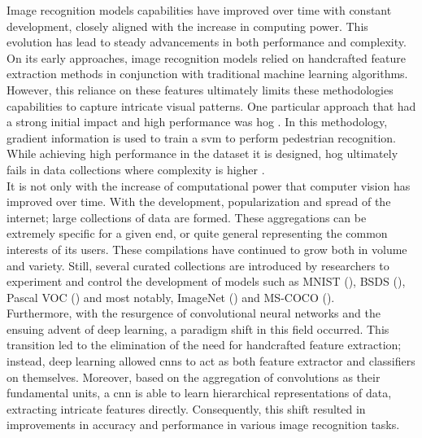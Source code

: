 \noindent Image recognition models capabilities have improved over time with constant development, 
closely aligned with the increase in computing power. This evolution has lead to steady 
advancements in both performance and complexity. On its early approaches, image recognition models 
relied on handcrafted feature extraction methods  in conjunction with traditional machine learning 
algorithms. However, this reliance on these features ultimately limits these methodologies 
capabilities to capture intricate visual patterns.
One particular approach that had a strong initial impact and high performance was \gls{hog} 
\autocite{dalal2005histograms}. In this methodology, gradient information is used to train a 
\gls{svm} to perform pedestrian recognition. While achieving high performance in the dataset it is 
designed, \gls{hog} ultimately fails in data collections where complexity is higher 
\autocite{5975165}.\\

\noindent It is not only with the increase of computational power that computer vision has improved 
over time. With the development, popularization and spread of the internet; large collections of 
data are formed. These aggregations can be extremely specific for a given end, or quite general 
representing the common interests of its users. These compilations have continued to 
grow both in volume and variety. Still, several curated collections are introduced by researchers 
to experiment and control the development of models such as MNIST (\cite{lecun1998gradient}), 
BSDS (\cite{MartinFTM01}), Pascal VOC (\cite{pascal-voc-2012}) and most notably, 
ImageNet (\cite{ILSVRC15}) and MS-COCO (\cite{lin2014microsoft}).\\

\noindent Furthermore, with the resurgence of convolutional neural networks and the ensuing advent 
of deep learning, a paradigm shift in this field occurred. This transition led to the elimination 
of the need for handcrafted feature extraction; instead, deep learning allowed \glspl{cnn} to act 
as both feature extractor and classifiers on themselves. Moreover, based on the aggregation of 
convolutions as their fundamental units, a \gls{cnn} is able to learn hierarchical 
representations of data, extracting intricate features directly. 
Consequently, this shift resulted in improvements in accuracy and performance in various image 
recognition tasks.\\

